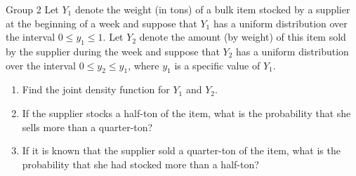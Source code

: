 \documentclass{article}
\begin{document}
\begin{problem}
    {Group 2}
    Let $Y_1$ denote the weight (in tons) of a bulk item stocked by a supplier at the beginning of a week and suppose that $Y_1$ has a uniform distribution over the interval $0 \leq y_1 \leq 1$. Let $Y_2$ denote the amount (by weight) of this item sold by the supplier during the week and suppose that $Y_2$ has a uniform distribution over the interval $0 \leq y_2 \leq y_1$, where $y_1$ is a specific value of $Y_1$.
    \begin{enumerate}
        \item Find the joint density function for $Y_1$ and $Y_2$.
        \item If the supplier stocks a half-ton of the item, what is the probability that she sells more than a quarter-ton?
        \item If it is known that the supplier sold a quarter-ton of the item, what is the probability that she had stocked more than a half-ton?
    \end{enumerate}
\end{problem}
\end{document}
